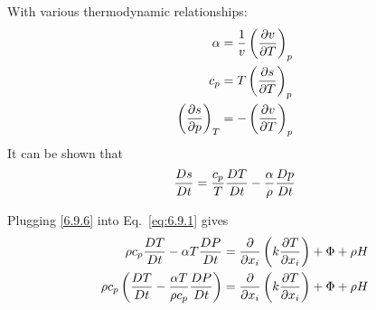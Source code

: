 \documentclass[document.tex]{subfiles}
\begin{document}
With various thermodynamic relationships: 
\begin{align}
    \alpha &= \frac{1}{v}\left(\pdv{v}{T}\right)_p \\
    c_p &= T\left(\pdv{s}{T}\right)_p \\
    \left(\pdv{s}{p}\right)_T &= -\left(\pdv{v}{T}\right)_p
\end{align}
It can be shown that 
\begin{align} \label{6.9.6}
    \frac{D s}{D t} = \frac{c_p}{T}\frac{D T}{D t} - \frac{\alpha}{\rho} \frac{D p}{D t}
\end{align}

Plugging \ref{6.9.6} into Eq.~\eqref{eq:6.9.1} gives 
\begin{align} \label{6.9.7}
    \begin{split}
    \rho c_p \frac{D T}{D t} - \alpha T \frac{D P}{D t} &= \pdv{x_i} \left(k\pdv{T}{x_i}\right) + \Phi + \rho H \\
    \rho c_p \left(\frac{D T}{D t} - \frac{\alpha T}{\rho c_p} \frac{D P}{D t} \right) &=\pdv{x_i} \left(k\pdv{T}{x_i}\right) + \Phi + \rho H \\    
    \end{split}
\end{align}



\end{document}

